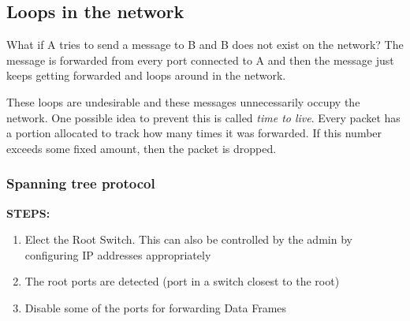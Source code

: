 \documentclass[12pt]{article}
\begin{document}
\subsection{Loops in the network}

What if A tries to send a message to B and B does not exist on the network? 
The message is forwarded from every port connected to A and then the message just keeps getting forwarded and loops around in the 
network. 

These loops are undesirable and these messages unnecessarily occupy the network. One possible 
idea to prevent this is called \textit{time to live}. Every packet has a portion allocated to track how many times it was 
forwarded. If this number exceeds some fixed amount, then the packet is dropped. 

\subsubsection{Spanning tree protocol}
\textbf{STEPS:}
\begin{enumerate}
    \item Elect the Root Switch. This can also be controlled by the admin by configuring IP addresses appropriately
    \item The root ports are detected (port in a switch closest to the root)
    \item Disable some of the ports for forwarding Data Frames
\end{enumerate}




\end{document}
